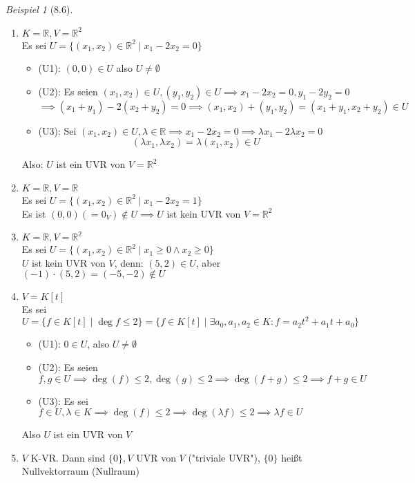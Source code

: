 \documentclass[a4paper]{scrartcl}
\DeclareMathOperator{\Exists}{\exists}
\theoremstyle{definition}
\theoremstyle{plain}
\theoremstyle{plain}
\theoremstyle{remark}
\theoremstyle{remark}
\theoremstyle{remark}
\theoremstyle{remark}
\theoremstyle{remark}
\newtheorem{ex}{Beispiel}
\begin{document}
\begin{ex}[8.6]
\mbox{}
\begin{enumerate}
\item $K = \mathbb{R}, V = \mathbb{R}^2$ \\
     Es sei $U = \{(x_1, x_2) \in \mathbb{R}^2 \mid x_1 - 2 x_2 = 0\}$
\begin{itemize}
\item (U1): $(0, 0) \in U$ also $U\neq \emptyset$
\item (U2): Es seien $(x_1, x_2) \in U, (y_1, y_2) \in U \implies x_1 - 2 x_2 = 0, y_1 - 2 y_2 = 0$
       \[\implies (x_1 + y_1) - 2(x_2 + y_2) = 0 \implies (x_1, x_2) + (y_1, y_2) = (x_1 + y_1, x_2 + y_2) \in U\]
\item (U3): Sei $(x_1, x_2) \in U, \lambda \in \mathbb{R} \implies x_1 - 2 x_2 = 0 \implies \lambda x_1 - 2\lambda x_2 = 0$
       \[(\lambda x_1, \lambda x_2) = \lambda (x_1, x_2) \in U\]
\end{itemize}
Also: $U$ ist ein UVR von $V = \mathbb{R}^2$
\item $K = \mathbb{R}, V = \mathbb{R}$ \\
     Es sei $U = \{(x_1, x_2) \in \mathbb{R}^2 \mid x_1 - 2 x_2 = 1\}$ \\
     Es ist $(0,0) ( = 0_V) \not\in U \implies U$ ist kein UVR von $V = \mathbb{R}^2$
\item $K = \mathbb{R}, V = \mathbb{R^2}$ \\
     Es sei $U = \{(x_1, x_2) \in \mathbb{R}^2 \mid x_1 \geq 0 \wedge x_2 \geq 0\}$ \\
     $U$ ist kein UVR von $V$, denn: $(5,2) \in U$, aber $(-1)\cdot (5,2) = (-5, -2) \not\in U$
\item $V = K[t]$ \\
     Es sei $U = \{f \in K[t] \mid \deg f \leq 2\} = \{f\in K[t] \mid \Exists a_0, a_1, a_2 \in K: f = a_2 t^2 + a_1 t + a_0\}$
\begin{itemize}
\item (U1): $0 \in U$, also $U \neq \emptyset$
\item (U2): Es seien $f,g \in U \implies \deg (f) \leq 2, \deg (g) \leq 2 \implies \deg(f + g) \leq 2 \implies f + g \in U$
\item (U3): Es sei $f \in U, \lambda \in K \implies \deg(f) \leq 2 \implies \deg(\lambda f) \leq 2 \implies \lambda f \in U$
\end{itemize}
Also $U$ ist ein UVR von $V$
\item $V$ K-VR. Dann sind $\{0\}, V$ UVR von $V$ ("triviale UVR"), $\{0\}$ heißt Nullvektorraum (Nullraum)
\end{enumerate}
\end{ex}
\end{document}
